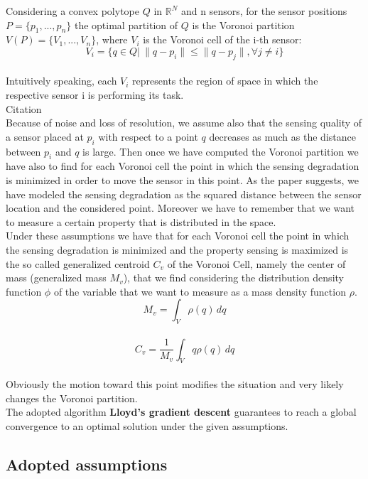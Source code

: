 \documentclass[a4paper,11pt,oneside]{book}
\begin{document}
	Considering a convex polytope $Q$ in $\mathbb{R}^N$ and n sensors, for the sensor positions $P=\{p_1,...,p_n\}$ the optimal partition of $Q$ is the Voronoi partition  $V(P)=\{V_1,...,V_n\}$, where $V_i$ is the Voronoi cell of the i-th sensor: $$V_i=\{q\in Q| \ \|q-p_i\|\le\|q-p_j\|, \forall j\not= i\}$$\\
	Intuitively speaking, each $V_i$ represents the region of space in which the respective sensor i is performing its task.\\
	
	
	Citation \cite{K1}\\
	
	Because of noise and loss of resolution, we assume also that the sensing quality of a sensor placed at $p_i$ with respect to a point $q$ decreases as much as the distance between $p_i$ and $q$ is large. Then once we have computed the Voronoi partition we have also to find for each Voronoi cell the point in which the sensing degradation is minimized in order to move the sensor in this point. As the paper suggests, we have modeled the sensing degradation as the squared distance between the sensor location and the considered point. Moreover we have to remember that we want to measure a certain property that is distributed in the space.\\
	Under these assumptions we have that for each Voronoi cell the point in which the sensing degradation is minimized and the property sensing is maximized is the so called generalized centroid $C_v$ of the Voronoi Cell, namely the center of mass (generalized mass $M_v$), that we find considering the distribution density function $\phi$ of the variable that we want to measure as a mass density function $\rho$.\\
		            $$M_v=\int_{V} \rho(q)\, dq$$  \\ 
	                $$C_v=\frac{1}{M_v} \int_{V} q \rho(q)\, dq$$  \\
	Obviously the motion toward this point modifies the situation and very likely changes the Voronoi partition.\\
	
	The adopted algorithm \textbf{Lloyd's gradient descent} guarantees to reach a global convergence to an optimal solution under the given assumptions.   
	
	\subsection{Adopted assumptions}
	
\end{document}
